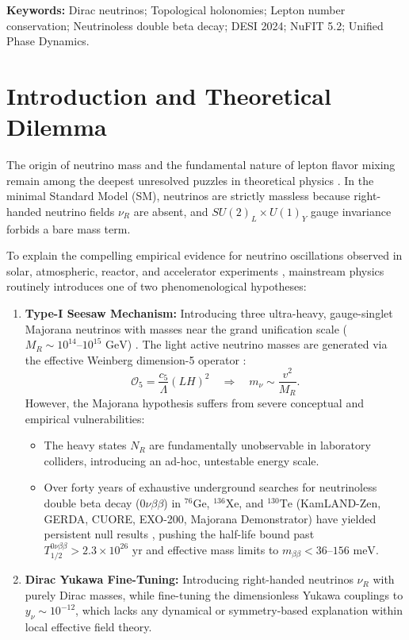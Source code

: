 \documentclass[11pt,a4paper]{article}
\theoremstyle{definition}
\begin{document}
\vspace{0.5em}
\noindent\textbf{Keywords:} Dirac neutrinos; Topological holonomies; Lepton number conservation; Neutrinoless double beta decay; DESI 2024; NuFIT 5.2; Unified Phase Dynamics.

\newpage

\section{Introduction and Theoretical Dilemma}

The origin of neutrino mass and the fundamental nature of lepton flavor mixing remain among the deepest unresolved puzzles in theoretical physics \cite{Pontecorvo1957, Maki1962}. In the minimal Standard Model (SM), neutrinos are strictly massless because right-handed neutrino fields $\nu_R$ are absent, and $SU(2)_L \times U(1)_Y$ gauge invariance forbids a bare mass term.

To explain the compelling empirical evidence for neutrino oscillations observed in solar, atmospheric, reactor, and accelerator experiments \cite{SuperK1998, SNO2002, KamLAND2003, DayaBay2012}, mainstream physics routinely introduces one of two phenomenological hypotheses:
\begin{enumerate}
    \item \textbf{Type-I Seesaw Mechanism:} Introducing three ultra-heavy, gauge-singlet Majorana neutrinos with masses near the grand unification scale ($M_R \sim 10^{14}\text{--}10^{15}\text{ GeV}$) \cite{Minkowski1977, GellMann1979, Yanagida1979, Mohapatra1980}. The light active neutrino masses are generated via the effective Weinberg dimension-5 operator \cite{Weinberg1979}:
    \begin{equation}
        \mathcal{O}_5 = \frac{c_5}{\Lambda} (L H)^2 \quad \Longrightarrow \quad m_\nu \sim \frac{v^2}{M_R}.
        \label{eq:weinberg_op}
    \end{equation}
    However, the Majorana hypothesis suffers from severe conceptual and empirical vulnerabilities:
    \begin{itemize}
        \item The heavy states $N_R$ are fundamentally unobservable in laboratory colliders, introducing an ad-hoc, untestable energy scale.
        \item Over forty years of exhaustive underground searches for neutrinoless double beta decay ($0\nu\beta\beta$) in $^{76}\mathrm{Ge}$, $^{136}\mathrm{Xe}$, and $^{130}\mathrm{Te}$ (KamLAND-Zen, GERDA, CUORE, EXO-200, Majorana Demonstrator) have yielded persistent null results \cite{KamLANDZen2023, GERDA2020, CUORE2021}, pushing the half-life bound past $T_{1/2}^{0\nu\beta\beta} > 2.3 \times 10^{26}\text{ yr}$ and effective mass limits to $m_{\beta\beta} < 36\text{--}156\text{ meV}$.
    \end{itemize}
    \item \textbf{Dirac Yukawa Fine-Tuning:} Introducing right-handed neutrinos $\nu_R$ with purely Dirac masses, while fine-tuning the dimensionless Yukawa couplings to $y_\nu \sim 10^{-12}$, which lacks any dynamical or symmetry-based explanation within local effective field theory.
\end{enumerate}
\end{document}
